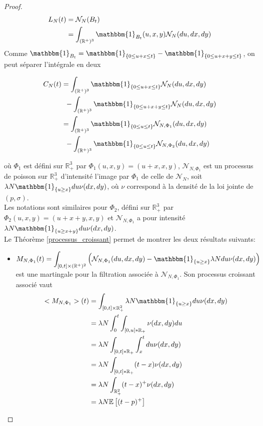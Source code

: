 \documentclass[12pt,a4paper]{article}
\newcommand{\E}[1]{\mathbb{E}\left[ #1 \right]}
\newcommand{\R}{\mathbb{R}}
\newcommand{\1}[1]{\mathbbm{1}_{\{#1\}} }
\theoremstyle{definition}
\begin{document}
{\begin{proof}
\begin{align*}
L_N(t) &=  \mathcal{N}_N(B_t)\\
&= \int_{(\R^+)^3} \mathbbm{1}_{B_t}(u,x,y) \mathcal{N}_N(du,dx,dy)
\end{align*}
Comme $\mathbbm{1}_{B_t} = \1{0\leq u+x \leq t} - \1{0\leq u+x+y \leq t}$, on peut séparer l'intégrale en deux


\begin{align*}
C_N(t) &= \int_{(\R^+)^3} \1{0\leq u+x \leq t} \mathcal{N}_N(du,dx,dy)\\ &\,\,\,-
\int_{(\R^+)^3} \1{0\leq u+x+y \leq t} \mathcal{N}_N(du,dx,dy)\\
&= \int_{(\R^+)^3} \1{0\leq u \leq t} \mathcal{N}_{N,\Phi_1}(du,dx,dy)\\ &\,\,\,-
\int_{(\R^+)^3} \1{0\leq u \leq t} \mathcal{N}_{N,\Phi_2}(du,dx,dy)\\
\end{align*}

où $\Phi_1$ est défini sur $\R_+^3$ par $\Phi_1(u,x,y) = (u+x,x,y)$, $\mathcal{N}_{N,\Phi_1}$  est un processus de poisson sur $\R_+^3$ d'intensité l'image par $\Phi_1$ de celle de $\mathcal{N}_N$, soit $\lambda N \1{u\geq x}du\nu(dx,dy)$, où $\nu$ correspond à la densité de la loi jointe de $(p,\sigma)$.\\
Les notations sont similaires pour $\Phi_2$, défini sur $\R_+^3$ par $\Phi_2(u,x,y) = (u+x+y,x,y)$ et $\mathcal{N}_{N,\Phi_1}$ a pour intensité $\lambda N \1{u\geq x+y}du\nu(dx,dy)$.\\


Le Théorème \ref{processus_croissant} permet de montrer les deux résultats suivants:


\begin{itemize}

\item $\displaystyle M_{N,\Phi_1}(t) = \int_{[0,t]\times (\R^+)^2}  \left(\mathcal{N}_{N,\Phi_1}(du,dx,dy)-\1{u\geq x}\lambda N du \nu(dx,dy)\right)$ est une martingale pour la filtration associée à $\mathcal{N}_{N,\Phi_1}$. Son processus croissant associé vaut\\
  
\begin{align*}
<M_{N,\Phi_1}>(t) &= \int_{[0,t]\times \R_+^2}\lambda N \1{u\geq x}du\nu(dx,dy)\\
&= \lambda N \int_0^t\int_{[0,u]*\R_+}\nu(dx,dy) du\\
&= \lambda N \int_{[0,t]*\R_+}\int_x^t du \nu(dx,dy)\\
&= \lambda N \int_{[0,t]*\R_+}(t-x) \nu(dx,dy)\\
&= \lambda N \int_{\R_+^2}(t-x)^+ \nu(dx,dy)\\
&= \lambda N \E{(t-p)^+}
\end{align*}  
  

\end{itemize}
\end{proof}}
\end{document}
